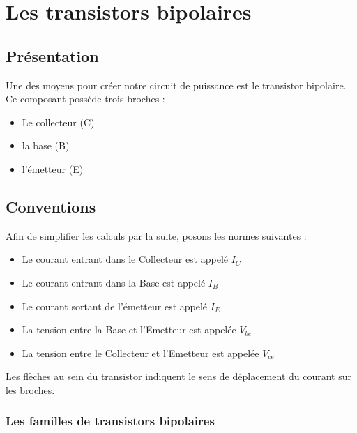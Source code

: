 

\chapter{Les transistors bipolaires}

\section{Présentation}

Une des moyens pour créer notre circuit de puissance est le transistor bipolaire.
Ce composant possède trois broches : 

\begin{itemize}

  \item Le collecteur (C)
  \item la base (B)
  \item l'émetteur (E)

\end{itemize}


\section{Conventions}

Afin de simplifier les calculs par la suite, posons les normes suivantes : 

\begin{itemize}

  \item Le courant entrant dans le Collecteur est appelé $I_{C}$
  \item Le courant entrant dans la Base est appelé $I_{B}$
  \item Le courant sortant de l'émetteur est appelé $I_{E}$

  \item La tension entre la Base et l'Emetteur est appelée $V_{be}$
  \item La tension entre le Collecteur et l'Emetteur est appelée $V_{ce}$
\end{itemize}



Les flèches au sein du transistor indiquent le sens de déplacement du courant sur les broches.

\subsection{Les familles de transistors bipolaires}

